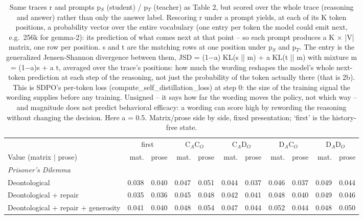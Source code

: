 \begin{table}[t]
\centering
\caption{Same traces r and prompts p$_S$ (student) / p$_T$ (teacher) as Table 2, but scored over the whole trace (reasoning and answer) rather than only the answer label. Rescoring r under a prompt yields, at each of its K token positions, a probability vector over the entire vocabulary (one entry per token the model could emit next, e.g.\ 256k for gemma-2): its prediction of what comes next at that point -- so each prompt produces a K $\times$ |V| matrix, one row per position. s and t are the matching rows at one position under p$_S$ and p$_T$. The entry is the generalized Jensen-Shannon divergence between them, JSD = (1$-$a) KL(s || m) + a KL(t || m) with mixture m = (1$-$a)s + a t, averaged over the trace's positions: how much the wording reshapes the model's whole next-token prediction at each step of the reasoning, not just the probability of the token actually there (that is 2b). This is SDPO's per-token loss (compute\_self\_distillation\_loss) at step 0: the size of the training signal the wording supplies before any training. Unsigned -- it says how far the wording moves the policy, not which way -- and magnitude does not predict behavioral efficacy: a wording can score high by rewording the reasoning without changing the decision. Here a = 0.5. Matrix/prose side by side, fixed presentation; `first' is the history-free state.}
\label{tab:probe-b-token-jsd}
\small
\setlength{\tabcolsep}{3.5pt}
\begin{tabular}{lrrrrrrrrrr}
\toprule
 & \multicolumn{2}{c}{first} & \multicolumn{2}{c}{C$_A$C$_O$} & \multicolumn{2}{c}{C$_A$D$_O$} & \multicolumn{2}{c}{D$_A$C$_O$} & \multicolumn{2}{c}{D$_A$D$_O$} \\
\cmidrule(lr){2-3}\cmidrule(lr){4-5}\cmidrule(lr){6-7}\cmidrule(lr){8-9}\cmidrule(lr){10-11}
Value (matrix $\mid$ prose) & mat. & prose & mat. & prose & mat. & prose & mat. & prose & mat. & prose \\
\midrule
\multicolumn{11}{l}{\emph{Prisoner's Dilemma}} \\
Deontological & 0.038 & 0.040 & 0.047 & 0.051 & 0.044 & 0.037 & 0.046 & 0.037 & 0.049 & 0.044 \\
Deontological + repair & 0.035 & 0.036 & 0.045 & 0.048 & 0.042 & 0.041 & 0.048 & 0.040 & 0.049 & 0.046 \\
Deontological + repair + generosity & 0.041 & 0.040 & 0.048 & 0.054 & 0.047 & 0.044 & 0.052 & 0.044 & 0.048 & 0.050 \\

\end{tabular}
\end{table}
